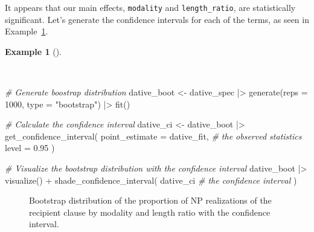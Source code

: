 \documentclass[
  letterpaper,
  DIV=11,
  numbers=noendperiod]{scrreprt}
\newenvironment{Shaded}{\begin{snugshade}}{\end{snugshade}}
\newcommand{\AttributeTok}[1]{\textcolor[rgb]{0.00,0.00,0.00}{#1}}
\newcommand{\CommentTok}[1]{\textcolor[rgb]{0.00,0.00,0.00}{\textit{#1}}}
\newcommand{\DecValTok}[1]{\textcolor[rgb]{0.00,0.00,0.00}{#1}}
\newcommand{\FloatTok}[1]{\textcolor[rgb]{0.00,0.00,0.00}{#1}}
\newcommand{\FunctionTok}[1]{\textcolor[rgb]{0.00,0.00,0.00}{#1}}
\newcommand{\NormalTok}[1]{\textcolor[rgb]{0.00,0.00,0.00}{#1}}
\newcommand{\OtherTok}[1]{\textcolor[rgb]{0.00,0.00,0.00}{#1}}
\newcommand{\SpecialCharTok}[1]{\textcolor[rgb]{0.00,0.00,0.00}{#1}}
\newcommand{\StringTok}[1]{\textcolor[rgb]{0.00,0.00,0.00}{#1}}
\theoremstyle{definition}
\newtheorem{example}{Example}[chapter]
\theoremstyle{remark}
\begin{document}
It appears that our main effects, \texttt{modality} and
\texttt{length\_ratio}, are statistically significant. Let's generate
the confidence intervals for each of the terms, as seen in
Example~\ref{exm-ida-cat-confidence-interval-logistic-regression}.

\begin{example}[]\protect\hypertarget{exm-ida-cat-confidence-interval-logistic-regression}{}\label{exm-ida-cat-confidence-interval-logistic-regression}

~

\begin{Shaded}
\begin{Highlighting}[]
\CommentTok{\# Generate boostrap distribution}
\NormalTok{dative\_boot }\OtherTok{\textless{}{-}}
\NormalTok{  dative\_spec }\SpecialCharTok{|\textgreater{}}
  \FunctionTok{generate}\NormalTok{(}\AttributeTok{reps =} \DecValTok{1000}\NormalTok{, }\AttributeTok{type =} \StringTok{"bootstrap"}\NormalTok{) }\SpecialCharTok{|\textgreater{}}
  \FunctionTok{fit}\NormalTok{()}

\CommentTok{\# Calculate the confidence interval}
\NormalTok{dative\_ci }\OtherTok{\textless{}{-}}
\NormalTok{  dative\_boot }\SpecialCharTok{|\textgreater{}}
  \FunctionTok{get\_confidence\_interval}\NormalTok{(}
    \AttributeTok{point\_estimate =}\NormalTok{ dative\_fit, }\CommentTok{\# the observed statistics}
    \AttributeTok{level =} \FloatTok{0.95}
\NormalTok{  )}

\CommentTok{\# Visualize the bootstrap distribution with the confidence interval}
\NormalTok{dative\_boot }\SpecialCharTok{|\textgreater{}}
  \FunctionTok{visualize}\NormalTok{() }\SpecialCharTok{+}
  \FunctionTok{shade\_confidence\_interval}\NormalTok{(}
\NormalTok{    dative\_ci }\CommentTok{\# the confidence interval}
\NormalTok{  )}
\end{Highlighting}
\end{Shaded}

\begin{figure}[H]


\caption{\label{fig-ida-cat-confidence-interval-logistic-regression}Bootstrap
distribution of the proportion of NP realizations of the recipient
clause by modality and length ratio with the confidence interval.}

\end{figure}%

\end{example}
\end{document}
